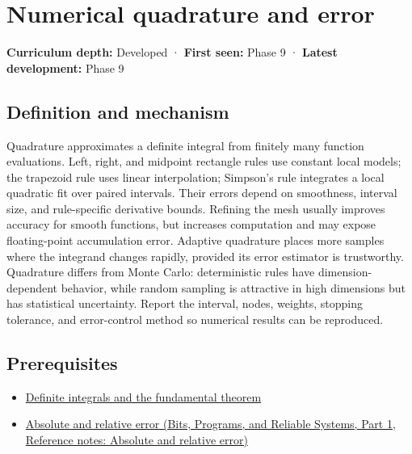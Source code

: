 \hypertarget{appendix-80521eae6b71}{}\label{referencestart:appendix-80521eae6b71}
\section{Numerical quadrature and error}\label{appendix-80521eae6b71-numerical-quadrature-and-error}

\hypertarget{appendix-80521eae6b71-numerical-quadrature-and-error}{}

\textbf{Curriculum depth:} Developed · \textbf{First seen:} Phase 9 · \textbf{Latest development:} Phase 9

\begin{allmightroledefinition}

\subsection{Definition and mechanism}\label{appendix-80521eae6b71-definition-and-mechanism}

\hypertarget{appendix-80521eae6b71-definition-and-mechanism}{}

Quadrature approximates a definite integral from finitely many function evaluations. Left, right, and midpoint rectangle rules use constant local models; the trapezoid rule uses linear interpolation; Simpson's rule integrates a local quadratic fit over paired intervals. Their errors depend on smoothness, interval size, and rule-specific derivative bounds. Refining the mesh usually improves accuracy for smooth functions, but increases computation and may expose floating-point accumulation error. Adaptive quadrature places more samples where the integrand changes rapidly, provided its error estimator is trustworthy. Quadrature differs from Monte Carlo: deterministic rules have dimension-dependent behavior, while random sampling is attractive in high dimensions but has statistical uncertainty. Report the interval, nodes, weights, stopping tolerance, and error-control method so numerical results can be reproduced.

\end{allmightroledefinition}

\subsection{Prerequisites}\label{appendix-80521eae6b71-prerequisites}

\hypertarget{appendix-80521eae6b71-prerequisites}{}

\begin{itemize}
\tightlist
\item
  \hyperref[appendix-1a50e72435c2]{Definite integrals and the fundamental theorem}
\item
  \href{../01-Bits-Programs-and-Reliable-Systems-P01/main.pdf\#appendix-3ae74e89b4e6}{Absolute and relative error (Bits, Programs, and Reliable Systems, Part 1, Reference notes: Absolute and relative error)}
\end{itemize}

